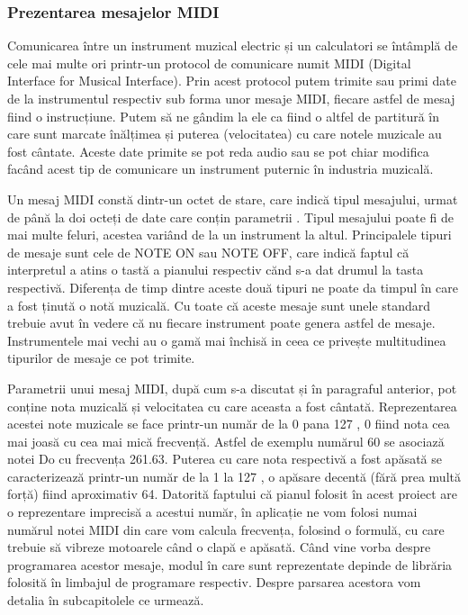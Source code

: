 \documentclass[../IoMusT.tex]{subfiles}
\begin{document}
\subsubsection{Prezentarea mesajelor MIDI}
Comunicarea între un instrument muzical electric și un calculatori se întâmplă de cele mai multe ori printr-un protocol de comunicare numit MIDI (Digital Interface for Musical Interface). Prin acest protocol putem trimite sau primi date de la instrumentul respectiv sub forma unor mesaje MIDI, fiecare astfel de mesaj fiind o instrucțiune. Putem să ne gândim la ele ca fiind o altfel de partitură în care sunt marcate înălțimea și puterea (velocitatea) cu care notele muzicale au fost cântate. Aceste date primite se pot reda audio sau se pot chiar modifica facând acest tip de comunicare un instrument puternic în industria muzicală. 
\\
\par Un mesaj MIDI constă dintr-un octet de stare, care indică tipul mesajului, urmat de până la doi octeți de date care conțin parametrii \cite{MIDIBytes}. Tipul mesajului poate fi de mai multe feluri, acestea variând de la un instrument la altul. Principalele tipuri de mesaje sunt cele de NOTE ON sau NOTE OFF, care indică faptul că interpretul a atins o tastă a pianului respectiv cănd s-a dat drumul la tasta respectivă. Diferența de timp dintre aceste două tipuri ne poate da timpul în care a fost ținută o notă muzicală. Cu toate că aceste mesaje sunt unele standard trebuie avut în vedere că nu fiecare instrument poate genera astfel de mesaje. Instrumentele mai vechi au o gamă mai închisă in ceea ce privește multitudinea tipurilor de mesaje ce pot trimite.
\\ 
\par Parametrii unui mesaj MIDI, după cum s-a discutat și în paragraful anterior, pot conține nota muzicală și velocitatea cu care aceasta a fost cântată. Reprezentarea acestei note muzicale se face printr-un număr de la 0 pana 127 \cite{MidiSoftware}, 0 fiind nota cea mai joasă cu cea mai mică frecvență. Astfel de exemplu numărul 60 se asociază notei Do cu frecvența 261.63. Puterea cu care nota respectivă a fost apăsată se caracterizează printr-un număr de la 1 la 127 \cite{MidiSoftware}, o apăsare decentă (fără prea multă forță) fiind aproximativ 64. Datorită faptului că pianul folosit în acest proiect are o reprezentare imprecisă a acestui număr, în aplicație ne vom folosi numai numărul notei MIDI din care vom calcula frecvența, folosind o formulă, cu care trebuie să vibreze motoarele când o clapă e apăsată. Când vine vorba despre programarea acestor mesaje, modul în care sunt reprezentate depinde de librăria folosită în limbajul de programare respectiv. Despre parsarea acestora vom detalia în subcapitolele ce urmează.
\end{document}
